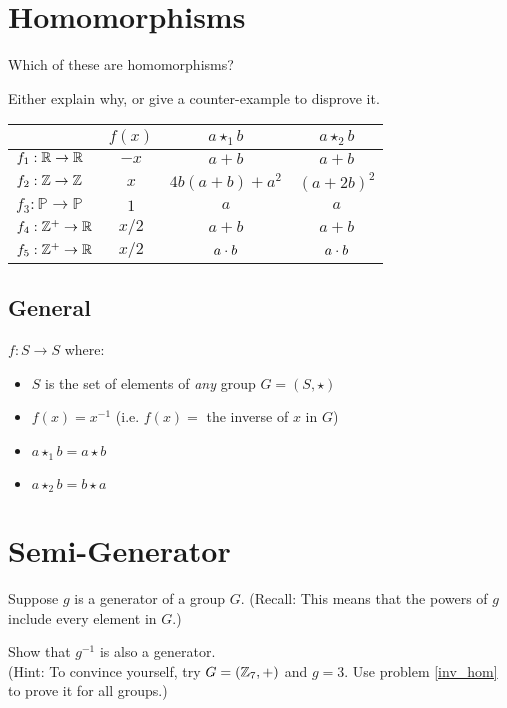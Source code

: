 \documentclass[12pt]{article}
\begin{document}
 
\section{Homomorphisms}

Which of these are homomorphisms?

Either explain why, or give a counter-example to disprove it.

\begin{center}
\begin{tabular}{|l|c|c|c|}
\hline
& $f(x)$ & $a \star_1 b$ & $a \star_2 b$ \\
\hline
$f_1 : \mathbb{R} \to \mathbb{R}$ & $-x$ & $a + b$ & $a + b$ \\
\hline
$f_2 : \mathbb{Z} \to \mathbb{Z}$ & $x$ & $4b(a + b) + a^2$ & $(a + 2b)^2$ \\
\hline
$f_3 : \mathbb{P} \to \mathbb{P}$ & $1$ & $a$ & $a$ \\
\hline
$f_4 : \mathbb{Z}^+ \to \mathbb{R}$ & $x / 2$ & $a + b$ & $a + b$ \\
\hline
$f_5 : \mathbb{Z}^+ \to \mathbb{R}$ & $x / 2$ & $a \cdot b$ & $a \cdot b$ \\
\hline
\end{tabular}
\end{center}


\subsection{General}

$f : S \to S$ where:
\label{inv_hom}
\begin{itemize}
\item $S$ is the set of elements of \emph{any} group $G = (S, \star)$
\item $f(x) = x^{-1}$ (i.e. $f(x) =$ the inverse of $x$ in $G$)
\item $a \star_1 b = a \star b$
\item $a \star_2 b = b \star a$
\end{itemize}

\section{Semi-Generator}

Suppose $g$ is a generator of a group $G$. (Recall: This means that the powers of $g$ include every element in $G$.)

Show that $g^{-1}$ is also a generator.\\

(Hint: To convince yourself, try $G = (\mathbb{Z}_7, +)$ and $g=3$. Use problem \ref{inv_hom} to prove it for all groups.)
\end{document}
